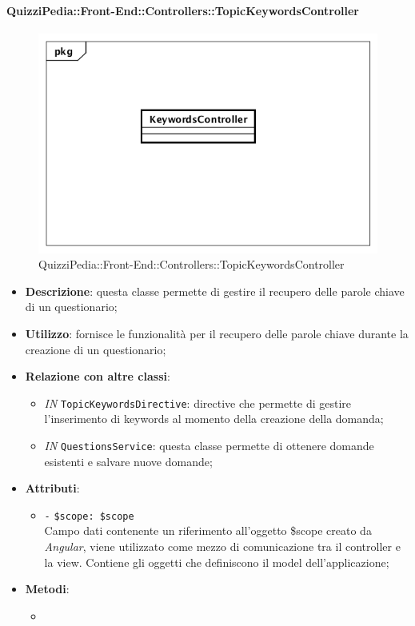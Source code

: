 \paragraph{QuizziPedia::Front-End::Controllers::TopicKeywordsController}
\begin{figure}
	\centering
	\includegraphics[scale=0.45]{UML/Classi/Front-End/QuizziPedia_Front-end_Controller_TopicKeywordsController.png}
	\caption{QuizziPedia::Front-End::Controllers::TopicKeywordsController}
\end{figure}
\begin{itemize}
	\item \textbf{Descrizione}: questa classe permette di gestire il recupero delle parole chiave di un questionario;
	\item \textbf{Utilizzo}: fornisce le funzionalità per il recupero delle parole chiave durante la creazione di un questionario;
	\item \textbf{Relazione con altre classi}:
	\begin{itemize}
		\item \textit{IN} \texttt{TopicKeywordsDirective}: directive che permette di gestire l'inserimento di keywords al momento della creazione della domanda; 
		\item \textit{IN} \texttt{QuestionsService}: questa classe permette di ottenere domande esistenti e salvare nuove domande; 
	\end{itemize}
	\item \textbf{Attributi}:
	\begin{itemize}
		\item \texttt{-} \texttt{\$scope: \$scope} \\
		Campo dati contenente un riferimento all’oggetto \$scope creato da \textit{Angular}, viene utilizzato come mezzo di comunicazione tra il controller e la view. Contiene gli oggetti che definiscono il model dell’applicazione;
	\end{itemize}
	\item \textbf{Metodi}:
	\begin{itemize}
		\item 
	\end{itemize}
\end{itemize}

